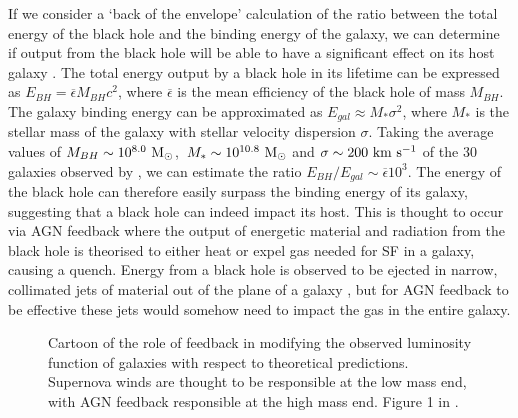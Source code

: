 If we consider a `back of the envelope' calculation of the ratio between the total energy of the black hole and the binding energy of the galaxy, we can determine if output from the black hole will be able to have a significant effect on its host galaxy \citep[see p.649 of][]{mo10}. The total energy output by a black hole in its lifetime can be expressed as $E_{BH} = \overline{\epsilon}M_{BH}c^2$, where $\overline{\epsilon}$ is the mean efficiency of the black hole of mass $M_{BH}$. The galaxy binding energy can be approximated as $E_{gal} \approx M_{*}\sigma^2$, where $M_{*}$ is the stellar mass of the galaxy with stellar velocity dispersion $\sigma$. Taking the average values of $M_{BH} \sim 10^{8.0}~\rm{M}_{\odot}$,~$M_{*} \sim 10^{10.8}~\rm{M}_{\odot}$ and $\sigma \sim 200~\rm{km}~\rm{s}^{-1}$ of the 30 galaxies observed by \citet{haringrix04}, we can estimate the ratio $E_{BH}/E_{gal} \sim \overline{\epsilon} 10^3$. The energy of the black hole can therefore easily surpass the binding energy of its galaxy, suggesting that a black hole can indeed impact its host. This is thought to occur via AGN feedback where the output of energetic material and radiation from the black hole is theorised to either heat or expel gas needed for SF in a galaxy, causing a quench. Energy from a black hole is observed to be ejected in narrow, collimated jets of material out of the plane of a galaxy \citep[see review by][]{homan12}, but for AGN feedback to be effective these jets would somehow need to impact the gas in the entire galaxy. 

\begin{figure}[t]
\caption[Illustration of the mismatch between theoretical and observed luminosity function from Silk \& Mamon (2012)]{Cartoon of the role of feedback in modifying the observed luminosity function of galaxies with respect to theoretical predictions. Supernova winds are thought to be responsible at the low mass end, with AGN feedback responsible at the high mass end. Figure 1 in \cite{silk12}.}
\label{fig:lumfuncpic}
\end{figure}

